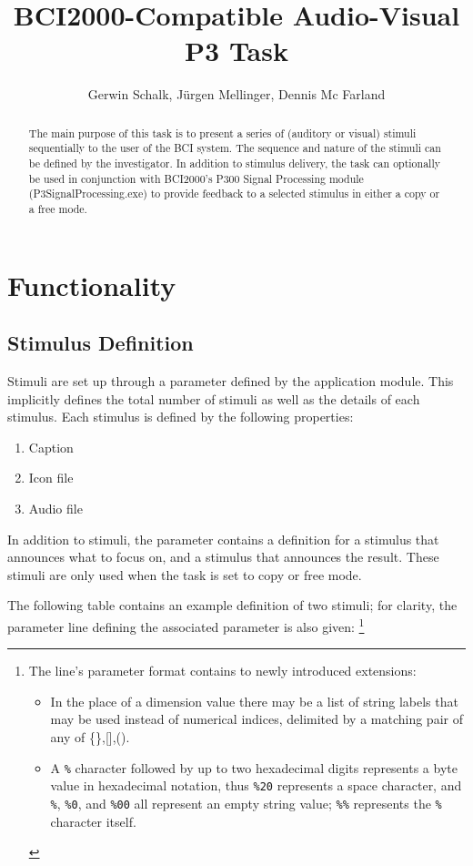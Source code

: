 \documentclass[letterpaper,oneside,12pt]{article}
\begin{document}
%
\title{BCI2000-Compatible Audio-Visual P3 Task}
\author{Gerwin Schalk, J\"{u}rgen Mellinger, Dennis Mc Farland}
\maketitle

\tableofcontents

\newpage 

\begin{abstract}

The main purpose of this task is to present a series of (auditory or visual) 
stimuli sequentially to the user of the BCI system. The sequence and nature of 
the stimuli can be defined by the investigator. In addition to stimulus 
delivery, the task can optionally be used in conjunction with BCI2000's P300 
Signal Processing module (P3SignalProcessing.exe) to provide feedback to a 
selected stimulus in either a copy or a free mode.

\end{abstract}

\section{Functionality}

\subsection{Stimulus Definition}

Stimuli are set up through a parameter defined by the application module. This
implicitly defines the total number of stimuli as well as the details of each stimulus.
Each stimulus is defined by the following properties:
\begin{enumerate}
 \item Caption
 \item Icon file
 \item Audio file
\end{enumerate}

In addition to stimuli, the parameter contains a definition for a stimulus that 
announces what to focus on, and a stimulus that announces the result. These
stimuli are only used when the task is set to copy or free mode.

The following table contains an example definition of two stimuli;
for clarity, the parameter line defining the associated parameter is also given:
\footnote{
  The line's parameter format contains to newly introduced extensions:
  \begin{itemize}
  \item In the place of a dimension value there may be a list of string labels
        that may be used instead of numerical indices, delimited by a matching
        pair of any of \{\},[],().
  \item A \texttt{\%} character followed by up to two hexadecimal digits represents
        a byte value in hexadecimal notation, thus \texttt{\%20} represents a
        space character, and \texttt{\%}, \texttt{\%0}, and \texttt{\%00} all
        represent an empty string value; \texttt{\%\%} represents the \texttt{\%}
        character itself.
  \end{itemize}
}
\end{document}
